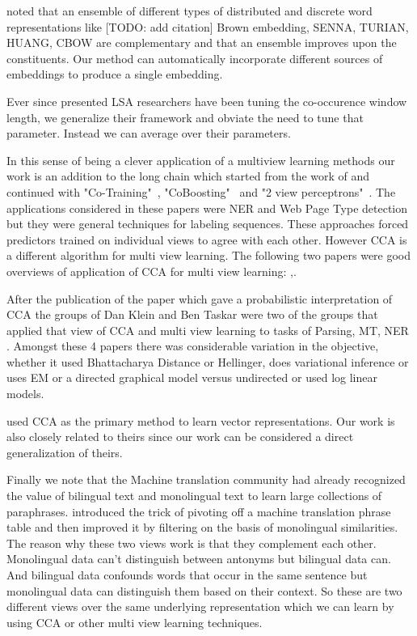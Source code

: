 \documentclass[11pt]{article}
\begin{document}
\cite{bansal2014tailoring} noted that an ensemble of different
types of distributed and discrete word representations like [TODO: add
  citation] Brown embedding, SENNA, TURIAN, HUANG, CBOW are
complementary and that an ensemble  improves upon the
constituents. Our method can automatically incorporate different
sources of embeddings to produce a single embedding.

Ever since \cite{landauer1997solution} presented LSA researchers have
been tuning the co-occurence window length, we generalize their framework
and obviate the need to tune that parameter. Instead we can average
over their parameters.

In this sense of being a clever application of a multiview
learning methods our work is an addition to the long chain which
started from the work of \cite{yarowsky1995unsupervised} and continued
with "Co-Training"~\cite{blum1998combining}, "CoBoosting"~\cite{collins1999unsupervised} and "2 view
perceptrons"~\cite{brefeld2006efficient}.  The applications considered
in these papers were NER and Web Page Type detection but they were
general techniques for labeling sequences. These approaches forced
predictors trained on individual views to agree with each other.
However CCA is a different algorithm for multi view learning. 
The following two papers were good overviews of application of CCA for
multi view learning: \cite{kakade2007multi},\cite{ganchevuai08}.

After the publication of the paper \cite{bach2005probabilistic} which gave a probabilistic
interpretation of CCA the groups of Dan Klein and Ben Taskar were two
of the groups that applied that view of CCA and multi view learning to tasks of Parsing,
MT, NER \cite{ganchevuai08,Burkett2008Two,burkett2010learning,haghighi2008learning}.
Amongst these 4 papers there was considerable variation in the
objective, whether it used Bhattacharya Distance or Hellinger, does
variational inference or uses EM or a directed graphical model
versus undirected or used log linear models. 

\cite{dhillon2011multi,dhillon2012two} used
CCA as the primary method to learn vector representations. Our work
is also closely related to theirs since our 
work can be considered a direct generalization of theirs. 

Finally we note that the Machine translation community had already
recognized the value of bilingual text and monolingual text
to learn large collections of paraphrases.
\cite{bannard2005paraphrasing} introduced the trick of pivoting off a
machine translation phrase table and then \cite{ganitkevitch2013ppdb}
improved it by filtering on the basis of monolingual
similarities. The reason why these
two views work is 
that they complement each other. Monolingual data can't distinguish
between antonyms but bilingual data can. And bilingual data confounds
words that occur in the same sentence but monolingual data can
distinguish them based on their context. So these are two different
views over the same underlying representation which we can learn by
using CCA or other multi view learning techniques.
\end{document}
